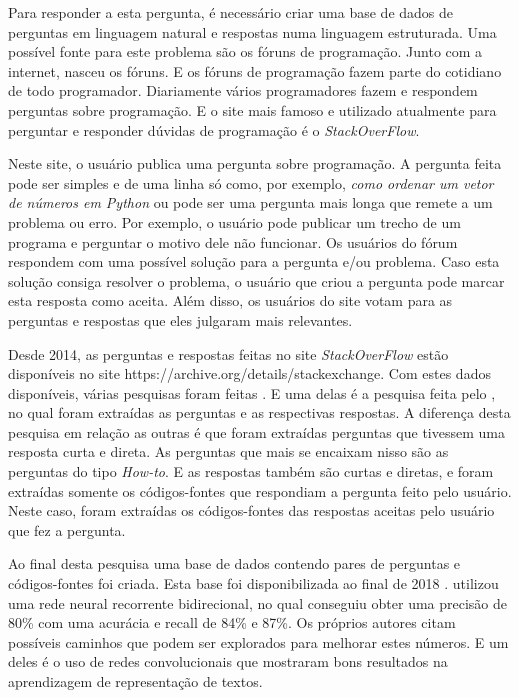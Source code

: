 Para responder a esta pergunta, é necessário criar uma base de dados de perguntas em linguagem natural e respostas numa linguagem estruturada. Uma possível fonte para este problema são os fóruns de programação. Junto com a internet, nasceu os fóruns. E os fóruns de programação fazem parte do cotidiano de todo programador. Diariamente vários programadores fazem e respondem perguntas sobre programação. E o site mais famoso e utilizado atualmente para perguntar e responder dúvidas de programação é o \textit{StackOverFlow}. 

Neste site, o usuário publica uma pergunta sobre programação. A pergunta feita pode ser simples e de uma linha só como, por exemplo, \textit{como ordenar um vetor de números em Python} ou pode ser uma pergunta mais longa que remete a um problema ou erro. Por exemplo, o usuário pode publicar um trecho de um programa e perguntar o motivo dele não funcionar. Os usuários do fórum respondem com uma possível solução para a pergunta e/ou problema. Caso esta solução consiga resolver o problema, o usuário que criou a pergunta pode marcar esta resposta como aceita. Além disso, os usuários do site votam para as perguntas e respostas que eles julgaram mais relevantes. 

Desde 2014, as perguntas e respostas feitas no site \textit{StackOverFlow} estão disponíveis no site https://archive.org/details/stackexchange. Com estes dados disponíveis, várias pesquisas foram feitas . E uma delas é a pesquisa feita pelo \cite{yao-2018}, no qual foram extraídas as perguntas e as respectivas respostas. A diferença desta pesquisa em relação as outras é que foram extraídas perguntas que tivessem uma resposta curta e direta. As perguntas que mais se encaixam nisso são as perguntas do tipo \textit{How-to}. E as respostas também são curtas e diretas, e foram extraídas somente os códigos-fontes que respondiam a pergunta feito pelo usuário. Neste caso, foram extraídas os códigos-fontes das respostas aceitas pelo usuário que fez a pergunta. 

Ao final desta pesquisa uma base de dados contendo pares de perguntas e códigos-fontes foi criada. Esta base foi disponibilizada ao final de 2018 \cite{yao-2018}. \citeauthor{yao-2018} utilizou uma rede neural recorrente bidirecional, no qual conseguiu obter uma precisão de 80\% com uma acurácia e recall de 84\% e 87\%. Os próprios autores citam possíveis caminhos que podem ser explorados para melhorar estes números. E um deles é o uso de redes convolucionais que mostraram bons resultados na aprendizagem de representação de textos.


